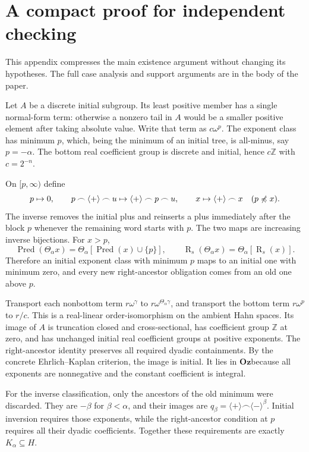 \documentclass[11pt]{article}
\theoremstyle{definition}
\theoremstyle{remark}
\newcommand{\Oz}{\ensuremath{\mathbf{Oz}}}
\newcommand{\Z}{\mathbb{Z}}
\newcommand{\Pred}{\operatorname{Pred}}
\newcommand{\Rs}{\operatorname{R}_{s}}
\newcommand{\cat}{\mathbin{\frown}}
\newcommand{\plus}{\langle+\rangle}
\newcommand{\minus}{\langle-\rangle}
\newcommand{\pre}{\mathrel{\preccurlyeq}}
\begin{document}
\appendix
\section{A compact proof for independent checking}\label{isg:app:compact}

This appendix compresses the main existence argument without changing
its hypotheses. The full case analysis and support arguments are in the
body of the paper.

Let $A$ be a discrete initial subgroup. Its least positive member has a
single normal-form term: otherwise a nonzero tail in $A$ would be a
smaller positive element after taking absolute value. Write that term
as $c\omega^p$. The exponent class has minimum $p$, which, being the
minimum of an initial tree, is all-minus, say $p=-\alpha$.
The bottom real coefficient group is discrete and initial, hence
$c\Z$ with $c=2^{-n}$.

On $[p,\infty)$ define
\[
 p\mapsto0,\qquad
 p\cat\plus\cat u\mapsto\plus\cat p\cat u,\qquad
 x\mapsto\plus\cat x\quad(p\not\pre x).
\]
The inverse removes the initial plus and reinserts a plus immediately
after the block $p$ whenever the remaining word starts with $p$.
The two maps are increasing inverse bijections. For $x>p$,
\[
 \Pred(\Theta_\alpha x)
   =\Theta_\alpha[\Pred(x)\cup\{p\}],
 \qquad
 \Rs(\Theta_\alpha x)=\Theta_\alpha[\Rs(x)].
\]
Therefore an initial exponent class with minimum $p$ maps to an initial
one with minimum zero, and every new right-ancestor obligation comes
from an old one above $p$.

Transport each nonbottom term $r\omega^\gamma$ to
$r\omega^{\Theta_\alpha\gamma}$, and transport the bottom term
$r\omega^p$ to $r/c$. This is a real-linear order-isomorphism on the
ambient Hahn spaces. Its image of $A$ is truncation closed and
cross-sectional, has coefficient group $\Z$ at zero, and has unchanged
initial real coefficient groups at positive exponents. The right-ancestor
identity preserves all required dyadic containments. By the concrete
Ehrlich--Kaplan criterion, the image is initial. It lies in \Oz because
all exponents are nonnegative and the constant coefficient is integral.

For the inverse classification, only the ancestors of the old minimum
were discarded. They are $-\beta$ for $\beta<\alpha$, and their images
are $q_\beta=\plus\cat\minus^\beta$. Initial inversion requires
those exponents, while the right-ancestor condition at $p$ requires all
their dyadic coefficients. Together these requirements are exactly
$K_\alpha\subseteq H$.
\end{document}
